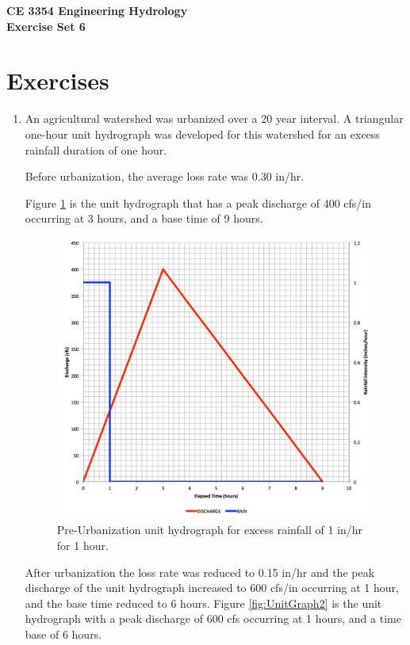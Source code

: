 \documentclass[12pt]{article}
\begin{document}
\begin{center}
{\textbf{{ CE 3354 Engineering Hydrology} \\ {Exercise Set 6}}}
\end{center}

 \section*{\small{Exercises}}
 \begin{enumerate}

\item An agricultural watershed was urbanized over a 20 year interval.  A triangular one-hour unit hydrograph was developed for this watershed for an excess rainfall duration of one hour.  

Before urbanization, the average loss rate was 0.30 in/hr.  

Figure \ref{fig:UnitGraph1} is the unit hydrograph that has a peak discharge of 400 cfs/in occurring at 3 hours, and a base time of 9 hours.
\begin{figure}[h!] %
   \centering
   \includegraphics[width=5in]{UnitGraph1.jpg} 
   \caption{Pre-Urbanization unit hydrograph for excess rainfall of 1 in/hr for 1 hour.}
   \label{fig:UnitGraph1}
\end{figure}
\clearpage

After urbanization the loss rate was reduced to 0.15 in/hr and the peak discharge of the unit hydrograph increased to 600 cfs/in occurring at 1 hour, and the base time reduced to 6 hours.    Figure \ref{fig:UnitGraph2} is the unit hydrograph with a peak discharge of 600 cfs occurring at 1 hours, and a time base of 6 hours.


\end{enumerate}
\end{document}
